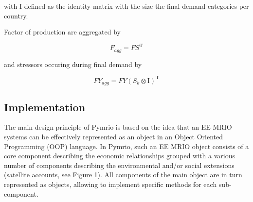\documentclass{jors}
\begin{document}
{{with $\mathrm{I}$ defined as the identity matrix with the size the final demand
categories per country.

Factor of production are aggregated by

\begin{equation}
    F_{agg} = FS^\mathrm{T} 
\end{equation}

and stressors occuring during final demand by

\begin{equation}
    FY_{agg} = FY(S_k \otimes \mathrm{I})^\mathrm{T}
\end{equation}

}

\subsection*{Implementation}


The main design principle of Pymrio is based on the idea that an EE MRIO systems can be effectively represented as an object in an Object Oriented Programming (OOP) language.
In Pymrio, such an EE MRIO object consists of a core component describing the economic relationships grouped with a various number of components describing the environmental and/or social extensions (satellite accounts, see Figure 1). 
All components of the main object are in turn represented as objects, allowing to implement specific methods for each sub-component.

}
\end{document}
